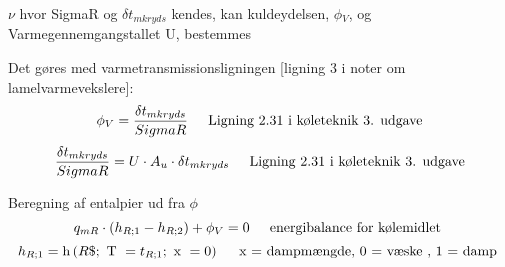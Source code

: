 \documentclass[../Hovedrapport.tex]{subfiles}
\newcommand{\F}[1]{\mbox{$#1$}}
\newcommand{\V}[1]{\mbox{$ #1 $}}
\newcommand{\I}{\mbox{\hspace{0.20in}}}
\newcommand{\enthalpy}{\mathrm{h}}
\begin{document}
\vspace{0.10in}
\noindent
\rm $\nu$ hvor SigmaR og ${\delta t}$$_{mkryds}$ kendes, kan kuldeydelsen, $\phi$$_{V}$, og Varmegennemgangstallet U, bestemmes

\vspace{0.10in}
\noindent
\rm Det gøres med varmetransmissionsligningen [ligning 3 i noter om lamelvarmevekslere]:
\begin{equation}
\label{EES Eqn:68}
\phi_{V} = \frac {{\delta t}_{mkryds}}{ \V{SigmaR	} } 
\mbox{\I Ligning 2.31 i køleteknik 3. udgave}
\end{equation}
\begin{equation}
\label{EES Eqn:69}
\frac {{\delta t}_{mkryds}}{ \V{SigmaR} }= U \cdot  A_{u} \cdot  {\delta t}_{mkryds	} 
\mbox{\I Ligning 2.31 i køleteknik 3. udgave}
\end{equation}

\vspace{0.10in}
\noindent
\rm Beregning af entalpier ud fra $\phi$
\begin{equation}
\label{EES Eqn:70}
q_{mR} \cdot   \left( h_{R;1} - h_{R;2} \right)  + \phi_{V} = 0	 
\mbox{\I energibalance for kølemidlet }
\end{equation}
\begin{equation}
\label{EES Eqn:71}
h_{R;1} = \enthalpy \left(\F{R}\$;\mbox{\ T }= t_{R;1};\mbox{\ x }= 0 \right) 		 
\mbox{\I x = dampmængde, 0 = væske , 1 = damp }
\end{equation}
\end{document}
